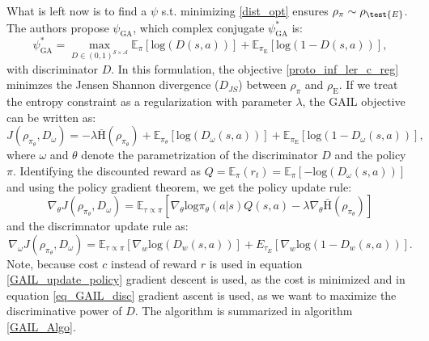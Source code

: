 What is left now is to find a $\psi$ s.t. minimizing \ref{dist_opt} ensures $\rho_{\pi} \sim \rho_{\test{E}}$. The authors propose $\psi_{\text{GA}}$, 
which complex conjugate $\psi^*_{\text{GA}}$ is: 
\begin{equation}
    \psi^*_{\text{GA}} = \max_{D\in(0,1)^{\mathcal{S} \times \mathcal{A}}} \mathbb{E}_{\pi}\left[ \text{log}(D(s,a))\right] + \mathbb{E}_{\pi_{\text{E}}}\left[ \text{log}(1 - D(s,a))\right],
\end{equation}
with discriminator $D$. In this formulation, the objective \ref{proto_inf_ler_c_reg} minimzes the Jensen Shannon divergence ($D_{JS}$) between $\rho_\pi$ and $\rho_{\text{E}}$. If we treat the entropy constraint as a regularization with 
parameter $\lambda$, the GAIL objective can be written as:
\begin{equation}
    J(\rho_{\pi_{\theta}}, D_{\omega}) = - \lambda  \bar{\text{H}}(\rho_{\pi_{\theta}} ) + \mathbb{E}_{\pi_{\theta}}\left[ \text{log}(D_{\omega}(s,a))\right] + \mathbb{E}_{\pi_{\text{E}}}\left[ \text{log}(1 - D_{\omega}(s,a))\right],
\end{equation}
where $\omega$ and $\theta$ denote the parametrization of the discriminator $D$ and the policy $\pi$. Identifying the discounted reward as $Q = \mathbb{E}_{\pi}(r_t) = \mathbb{E}_{\pi}\left[-\text{log}(D_{\omega}(s,a))\right]$ and using the policy 
gradient theorem, we get the policy update rule:
\begin{equation}
    \label{GAIL_update_policy}
    \nabla_{\theta} J(\rho_{\pi_{\theta}}, D_{\omega}) = \mathbb{E}_{\tau \propto \pi}\left[ \nabla_{\theta}\text{log}\pi_{\theta}(a|s) Q(s,a) -\lambda \nabla_{\theta}\bar{\text{H}}(\rho_{\pi_{\theta}} )  \right]
\end{equation}
and the discrimnator update rule as:
\begin{equation}
    \label{eq_GAIL_disc}
    \nabla_{\omega} J(\rho_{\pi_{\theta}}, D_{\omega}) = \mathbb{E}_{\tau \propto \pi} [\nabla_w \mathrm{log}(D_w(s,a))] + {E}_{\tau_E} [\nabla_w \mathrm{log}(1 - D_w(s,a))].
\end{equation}
Note, because cost $c$ instead of reward $r$ is used in equation \ref{GAIL_update_policy} gradient descent is used, as the cost is minimized and in equation \ref{eq_GAIL_disc} 
gradient ascent is used, as we want to maximize the discriminative power of $D$. The algorithm is summarized in algorithm \ref{GAIL_Algo}.\\ \\
